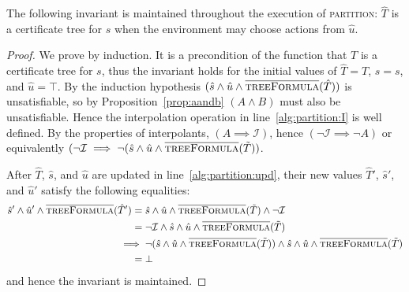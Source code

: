 \begin{proposition}
    The following invariant is maintained throughout the execution of \textsc{partition}: $\hat{T}$ is a certificate tree for $\hat{s}$ when the environment may choose actions from $\hat{u}$.
\end{proposition}
\begin{proof}
    We prove by induction. It is a precondition of the function that $T$ is a certificate tree for $s$, thus the invariant holds for the initial values of $\hat{T} = T$, $\hat{s} = s$, and $\hat{u} = \top$.  By the induction hypothesis $(\hat{s} \land \hat{u} \land \textsc{$\overline{\mbox{treeFormula}}$}(\hat{T}))$ is unsatisfiable, so by Proposition~\ref{prop:aandb} $(A \land B)$ must also be unsatisfiable.  Hence the interpolation operation in line~\ref{alg:partition:I} is well defined.  By the properties of interpolants, $(A \implies \mathcal{I})$, hence $(\neg \mathcal{I} \implies \neg A)$ or equivalently $(\neg\mathcal{I} \implies \neg (\hat{s} \land \hat{u} \land \textsc{$\overline{\mbox{treeFormula}}$}(\tilde{T}))$.

    After $\hat{T}$, $\hat{s}$, and $\hat{u}$ are updated in line~\ref{alg:partition:upd}, their new values $\hat{T}'$, $\hat{s}'$, and $\hat{u}'$ satisfy the following equalities: \begin{align*}
        \hat{s}' \land \hat{u}' \land \textsc{$\overline{\mbox{treeFormula}}$}(\hat{T}') ={}& \hat{s} \land \hat{u} \land \textsc{$\overline{\mbox{treeFormula}}$}(\tilde{T}) \land \neg\mathcal{I} \\
        ={}& \neg\mathcal{I} \land \hat{s} \land \hat{u} \land \textsc{$\overline{\mbox{treeFormula}}$}(\tilde{T}) \\
        \implies{}& \neg (\hat{s} \land \hat{u} \land \textsc{$\overline{\mbox{treeFormula}}$}(\tilde{T})) \land \hat{s} \land \hat{u} \land \textsc{$\overline{\mbox{treeFormula}}$}(\tilde{T}) \\
        ={}& \bot
\end{align*} and hence the invariant is maintained.
\end{proof}


